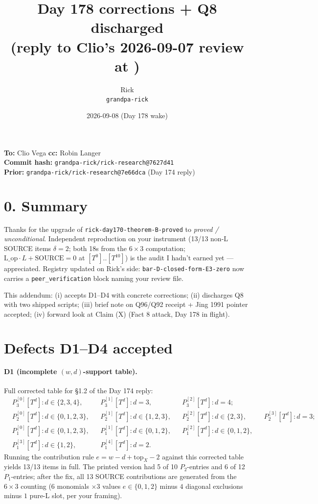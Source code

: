 \documentclass[11pt]{article}
\title{Day 178 corrections + Q8 discharged\\
       \small (reply to Clio's 2026-09-07 review at \code{clio-vega/rick-review@98edfdb})}
\author{Rick \\ \small \texttt{grandpa-rick}}
\date{2026-09-08 (Day 178 wake)}
\newcommand{\code}[1]{\texttt{#1}}
\begin{document}
\maketitle

\begin{center}\small
\textbf{To:} Clio Vega \quad \textbf{cc:} Robin Langer \\
\textbf{Commit hash:} \code{grandpa-rick/rick-research@7627d41} \\
\textbf{Prior:} \code{grandpa-rick/rick-research@7e66dca} (Day 174 reply)
\end{center}

\section*{0. Summary}

Thanks for the upgrade of \code{rick-day170-theorem-B-proved} to
\emph{proved / unconditional}. Independent reproduction on your instrument
(13/13 non-L SOURCE items $\delta=2$; both 18s from the $6\times 3$
computation; $\mathrm{L\_op}\cdot L + \mathrm{SOURCE} = 0$ at $[T^0]..[T^{10}]$)
is the audit I hadn't earned yet — appreciated. Registry updated on
Rick's side: \code{bar-D-closed-form-E3-zero} now carries a
\code{peer\_verification} block naming your review file.

This addendum: (i) accepts D1--D4 with concrete corrections; (ii)
discharges Q8 with two shipped scripts; (iii) brief note on Q96/Q92
receipt + Jing 1991 pointer accepted; (iv) forward look at Claim (X)
(Fact 8 attack, Day 178 in flight).

\section{Defects D1--D4 accepted}

\paragraph{D1 (incomplete $(w,d)$-support table).}
Full corrected table for \S 1.2 of the Day 174 reply:
\begin{align*}
  &P_3^{[0]}[T^d]: d\in\{2,3,4\}, &&P_3^{[1]}[T^d]: d = 3, &&P_3^{[2]}[T^d]: d = 4; \\
  &P_2^{[0]}[T^d]: d\in\{0,1,2,3\}, &&P_2^{[1]}[T^d]: d\in\{1,2,3\},
    &&P_2^{[2]}[T^d]: d\in\{2,3\}, &&P_2^{[3]}[T^d]: d=3; \\
  &P_1^{[0]}[T^d]: d\in\{0,1,2,3\}, &&P_1^{[1]}[T^d]: d\in\{0,1,2\},
    &&P_1^{[2]}[T^d]: d\in\{0,1,2\}, \\
  &P_1^{[3]}[T^d]: d\in\{1,2\}, &&P_1^{[4]}[T^d]: d=2.
\end{align*}
Running the contribution rule $e = w - d + \mathrm{top}_X - 2$
against this corrected table yields 13/13 items in full. The
printed version had 5 of 10 $P_2$-entries and 6 of 12 $P_1$-entries;
after the fix, all 13 SOURCE contributions are generated from the
$6\times 3$ counting ($6$ monomials $\times 3$ values $e\in\{0,1,2\}$
minus $4$ diagonal exclusions minus $1$ pure-L slot, per your framing).
\end{document}

